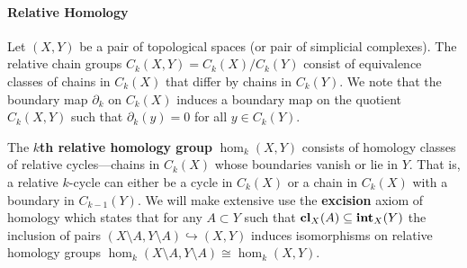 \paragraph{Relative Homology}

Let $(X, Y)$ be a pair of topological spaces (or pair of simplicial complexes).
The relative chain groups $C_k(X, Y) = C_k(X) / C_k(Y)$ consist of equivalence classes of chains in $C_k(X)$ that differ by chains in $C_k(Y)$.
We note that the boundary map $\partial_k$ on $C_k(X)$ induces a boundary map on the quotient $C_k(X, Y)$ such that $\partial_k(y) = 0$ for all $y\in C_k(Y)$.

The \textbf{$k$th relative homology group} $\hom_k(X, Y)$ consists of homology classes of relative cycles---chains in $C_k(X)$ whose boundaries vanish or lie in $Y$.
That is, a relative $k$-cycle can either be a cycle in $C_k(X)$ or a chain in $C_k(X)$ with a boundary in $C_{k-1}(Y)$.
We will make extensive use the \textbf{excision} axiom of homology which states that for any $A\subset Y$ such that $\mathbf{cl}_X(A)\subseteq \mathbf{int}_X(Y)$ the inclusion of pairs $(X\setminus A, Y\setminus A)\hookrightarrow (X, Y)$ induces isomorphisms on relative homology groups $\hom_k(X\setminus A, Y\setminus A)\cong\hom_k(X, Y)$.

%
%

